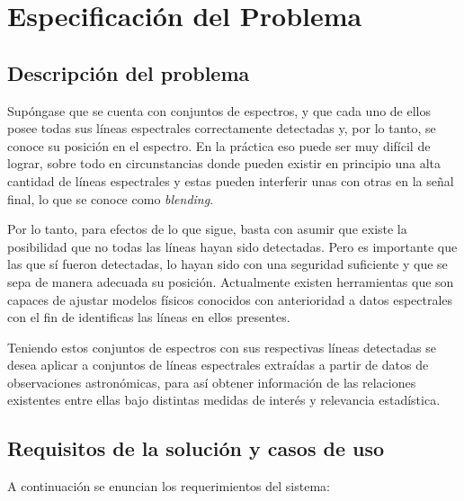 \chapter{Especificación del Problema}


\section{Descripción del problema}

Supóngase que se cuenta con conjuntos de espectros, y que cada uno de ellos posee todas sus líneas espectrales correctamente detectadas y, por lo tanto, se conoce su posición en el espectro. En la práctica eso puede ser muy difícil de lograr, sobre todo en circunstancias donde pueden existir en principio una alta cantidad de líneas espectrales y estas pueden interferir unas con otras en la señal final, lo que se conoce como \textit{blending}.

Por lo tanto, para efectos de lo que sigue, basta con asumir que existe la posibilidad que no todas las líneas hayan sido detectadas. Pero es importante que las que sí fueron detectadas, lo hayan sido con una seguridad suficiente y que se sepa de manera adecuada su posición. Actualmente existen herramientas que son capaces de ajustar modelos físicos conocidos con anterioridad a datos espectrales con el fin de identificas las líneas en ellos presentes.

Teniendo estos conjuntos de espectros con sus respectivas líneas detectadas se desea aplicar a conjuntos de líneas espectrales extraídas a partir de datos de observaciones astronómicas, para así obtener información de las relaciones existentes entre ellas bajo distintas medidas de interés y relevancia estadística.

\section{Requisitos de la solución y casos de uso}

A continuación se enuncian los requerimientos del sistema:

